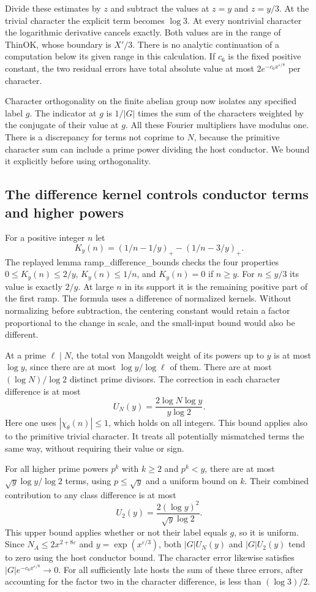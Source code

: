 \documentclass[12pt,letterpaper]{article}
\DeclareRobustCommand{\id}[1]{\mbox{\small\ttfamily #1}}
\begin{document}
Divide these estimates by \(z\) and subtract the values at \(z=y\) and \(z=y/3\). At the trivial character the explicit term becomes \(\log 3\). At every nontrivial character the logarithmic derivative cancels exactly. Both values are in the range of \id{ThinOK}, whose boundary is \(X'/3\). There is no analytic continuation of a computation below its given range in this calculation. If \(c_6\) is the fixed positive constant, the two residual errors have total absolute value at most \(2e^{-c_6 x^{\varepsilon/8}}\) per character.

Character orthogonality on the finite abelian group now isolates any specified label \(g\). The indicator at \(g\) is \(1/|G|\) times the sum of the characters weighted by the conjugate of their value at \(g\). All these Fourier multipliers have modulus one. There is a discrepancy for terms not coprime to \(N\), because the primitive character sum can include a prime power dividing the host conductor. We bound it explicitly before using orthogonality.

\subsection{The difference kernel controls conductor terms and higher powers}

For a positive integer \(n\) let
\[
       K_y(n)=(1/n-1/y)_+-(1/n-3/y)_+ .
\]
The replayed lemma \id{ramp\_difference\_bounds} checks the four properties \(0\le K_y(n)\le2/y\), \(K_y(n)\le1/n\), and \(K_y(n)=0\) if \(n\ge y\). For \(n\le y/3\) its value is exactly \(2/y\). At large \(n\) in its support it is the remaining positive part of the first ramp. The formula uses a difference of normalized kernels. Without normalizing before subtraction, the centering constant would retain a factor proportional to the change in scale, and the small-input bound would also be different.

At a prime \(\ell\mid N\), the total von Mangoldt weight of its powers up to \(y\) is at most \(\log y\), since there are at most \(\log y/\log\ell\) of them. There are at most \((\log N)/\log 2\) distinct prime divisors. The correction in each character difference is at most
\[
           U_N(y)=\frac{2\log N\log y}{y\log 2}.
\]
Here one uses \(|\chi_\theta(n)|\le1\), which holds on all integers. This bound applies also to the primitive trivial character. It treats all potentially mismatched terms the same way, without requiring their value or sign.

For all higher prime powers \(p^k\) with \(k\ge2\) and \(p^k<y\), there are at most \(\sqrt y\log y/\log2\) terms, using \(p\le\sqrt y\) and a uniform bound on \(k\). Their combined contribution to any class difference is at most
\[
                  U_2(y)=\frac{2(\log y)^2}{\sqrt y\log2}.
\]
This upper bound applies whether or not their label equals \(g\), so it is uniform. Since \(N_A\le2 x^{2+8\varepsilon}\) and \(y=\exp(x^{\varepsilon/3})\), both \(|G|U_N(y)\) and \(|G|U_2(y)\) tend to zero using the host conductor bound. The character error likewise satisfies \(|G|e^{-c_6 x^{\varepsilon/8}}\to0\). For all sufficiently late hosts the sum of these three errors, after accounting for the factor two in the character difference, is less than \((\log3)/2\).
\end{document}
